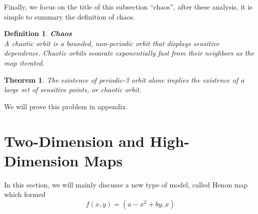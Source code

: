 \documentclass[12pt]{article}
\theoremstyle{plain}
\newtheorem{theorem}{\textbf{Theorem}}[section]
\newtheorem{definition}{{\color{red}\textbf{Definition}}}[section]
\begin{document}
Finally, we focus on the title of this subsection ``chaos'', after these analysis, it is simple to summary the definition of chaos.

\begin{definition}\label{chaos-orbit}\textbf{Chaos}
\\\noindent A chaotic orbit is a bounded, non-periodic orbit that displays sensitive dependence. Chaotic orbits seoarate exponentially fast from their neighbors as the map iterated.
\end{definition}


\begin{theorem} \label{p3-chaos}The existence of periodic-3 orbit alone implies the existence of a large set of sensitive points, or chaotic orbit.
\end{theorem}

We will prove this problem in appendix.

\newpage















\section{Two-Dimension and High-Dimension Maps}

In this section, we will mainly discusse a new type of model, called Henon map which formed
$$
f(x, y) = (a - x^2 + by, x) 
$$
\end{document}
